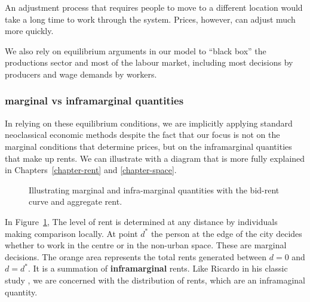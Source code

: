 {An adjustment process that requires people to move to a different location would take a long time to work through the system. Prices, however, can adjust much more quickly.




We also rely on equilibrium arguments in our model to ``black box'' the productions sector and most of  the labour market, including most decisions by producers and wage demands by workers. 


\subsubsection{\Gls{marginal} vs \gls{inframarginal} quantities}
In relying on these equilibrium conditions, we are implicitly applying standard neoclassical economic methods despite the fact that our focus is not on the \gls{marginal} conditions that determine prices, but on the \gls{inframarginal} quantities that make up rents. We can illustrate with a diagram that is more fully explained in Chapters~\ref{chapter-rent} and \ref{chapter-space}. 

\vspace{.3cm}

\begin{figure}[h!t!]
\centering

\caption{Illustrating marginal and infra-marginal quantities with the bid-rent curve and aggregate rent.}
\label{fig-land-rent-as-inframarginal}
\end{figure}


In Figure~\ref{fig-land-rent-as-inframarginal}, The level of rent is determined at any distance by individuals making comparison locally. At point $d^*$ the person at the edge of the city decides whether to work in the centre or in the non-urban space. These are \gls{marginal} decisions. The orange area represents  the total rents generated between $d=0$ and $d=d^*$. It is a summation of \textbf{\gls{inframarginal}} rents. Like Ricardo in his classic study \cite{ricardoEssayInfluenceLow1815}, we are concerned with the distribution of rents, which are an  inframaginal quantity.



}
